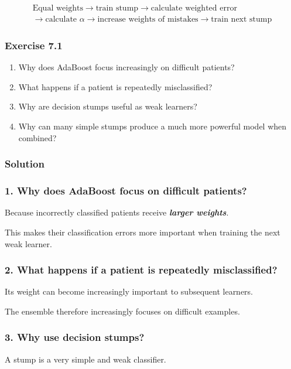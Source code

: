 \documentclass[10pt]{article}
\begin{document}
\[
\begin{gathered}
\text{Equal weights}\rightarrow\text{train stump}\rightarrow\text{calculate weighted error}\\
\rightarrow\text{calculate }\alpha\rightarrow\text{increase weights of mistakes}\rightarrow\text{train next stump}
\end{gathered}
\]

\subsubsection*{Exercise 7.1}
\begin{enumerate}
\item
Why does AdaBoost focus increasingly on difficult patients?

\item
What happens if a patient is repeatedly misclassified?

\item
Why are decision stumps useful as weak learners?

\item
Why can many simple stumps produce a much more powerful model when combined?

\end{enumerate}
\begingroup\color{red}

\subsubsection*{Solution}
\subsubsection*{1. Why does AdaBoost focus on difficult patients?}
Because incorrectly classified patients receive \textbf{\textit{larger weights}}.

This makes their classification errors more important when training the next weak learner.

\subsubsection*{2. What happens if a patient is repeatedly misclassified?}
Its weight can become increasingly important to subsequent learners.

The ensemble therefore increasingly focuses on difficult examples.

\subsubsection*{3. Why use decision stumps?}
A stump is a very simple and weak classifier.
\end{document}
